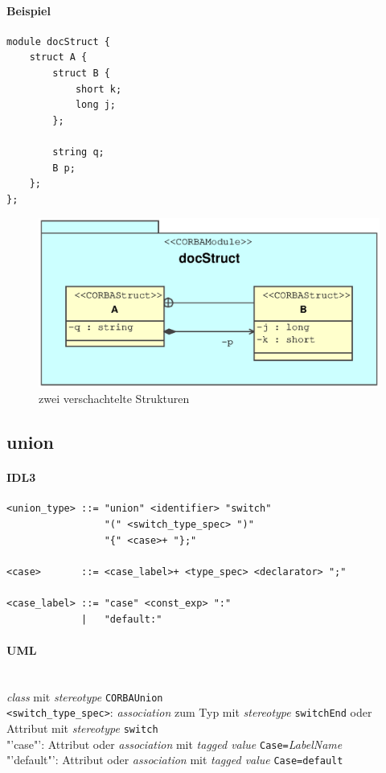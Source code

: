 \documentclass [a4paper,10pt] {scrartcl}
\begin{document}
\paragraph{Beispiel}
\begin{verbatim}
module docStruct {
    struct A {
        struct B {
            short k;
            long j;
        };

        string q;
        B p;
    };
};
\end{verbatim}
\begin{figure}[!h]
\centerline{\includegraphics[width=\linewidth]{docStruct.eps}}
\caption{zwei verschachtelte Strukturen}
\label{fig:struct}
\end{figure}

\cleardoublepage
\subsection{union}
\paragraph{IDL3}
\begin{verbatim}
<union_type> ::= "union" <identifier> "switch"
                 "(" <switch_type_spec> ")"
                 "{" <case>+ "};"

<case>       ::= <case_label>+ <type_spec> <declarator> ";"

<case_label> ::= "case" <const_exp> ":"
             |   "default:"
\end{verbatim}
\paragraph{UML}~\\
\emph{class} mit \emph{stereotype} \texttt{CORBAUnion}\\
\verb"<switch_type_spec>": \emph{association} zum Typ mit \emph{stereotype} \texttt{switchEnd}
oder Attribut mit \emph{stereotype} \texttt{switch}\\
"'case"': Attribut oder \emph{association} mit \emph{tagged value} \texttt{Case=}\emph{LabelName}\\
"'default"': Attribut oder \emph{association} mit \emph{tagged value} \texttt{Case=default}\\
\end{document}
